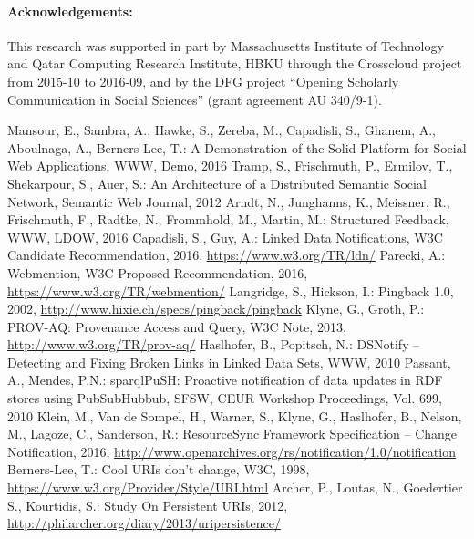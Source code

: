 \documentclass[a4paper]{llncs}
\begin{document}
\paragraph{Acknowledgements:}
This research was supported in part by Massachusetts Institute of Technology and Qatar Computing Research Institute, HBKU through the Crosscloud project from 2015-10 to 2016-09, and by the DFG project “Opening Scholarly Communication in Social Sciences” (grant agreement AU 340/9-1).

\begin{thebibliography}{99}
   Mansour, E., Sambra, A., Hawke, S., Zereba, M., Capadisli, S., Ghanem, A., Aboulnaga, A., Berners-Lee, T.: A Demonstration of the Solid Platform for Social Web Applications, WWW, Demo, 2016%
   Tramp, S., Frischmuth, P., Ermilov, T., Shekarpour, S., Auer, S.: An Architecture of a Distributed Semantic Social Network, Semantic Web Journal, 2012
   Arndt, N., Junghanns, K., Meissner, R., Frischmuth, F., Radtke, N., Frommhold, M., Martin, M.: Structured Feedback, WWW, LDOW, 2016%
   Capadisli, S., Guy, A.: Linked Data Notifications, W3C Candidate Recommendation, 2016, \url{https://www.w3.org/TR/ldn/}
   Parecki, A.: Webmention, W3C Proposed Recommendation, 2016,  \url{https://www.w3.org/TR/webmention/}
   Langridge, S., Hickson, I.: Pingback 1.0, 2002,  \url{http://www.hixie.ch/specs/pingback/pingback}
   Klyne, G., Groth, P.: PROV-AQ: Provenance Access and Query,  W3C Note, 2013, \url{http://www.w3.org/TR/prov-aq/}
   Haslhofer, B., Popitsch, N.: DSNotify – Detecting and Fixing Broken Links in Linked Data Sets, WWW, 2010%
   Passant, A., Mendes, P.N.: sparqlPuSH: Proactive notification of data updates in RDF stores using PubSubHubbub, SFSW, CEUR Workshop Proceedings, Vol. 699, 2010%
   Klein, M., Van de Sompel, H., Warner, S., Klyne, G., Haslhofer, B., Nelson, M., Lagoze, C., Sanderson, R.: ResourceSync Framework Specification – Change Notification, 2016,  \url{http://www.openarchives.org/rs/notification/1.0/notification}
   Berners-Lee, T.: Cool URIs don't change, W3C, 1998,  \url{https://www.w3.org/Provider/Style/URI.html}
   Archer, P., Loutas, N., Goedertier S., Kourtidis, S.: Study On Persistent URIs, 2012, \url{http://philarcher.org/diary/2013/uripersistence/}

\end{thebibliography}
\end{document}
